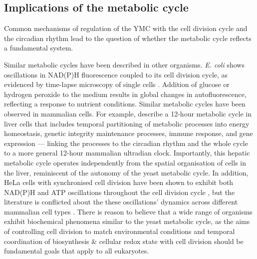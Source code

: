 \subsection{Implications of the metabolic cycle}
\label{subsec:intro-ymc-implications}


Common mechanisms of regulation of the YMC with the cell division cycle and the circadian rhythm
lead to the question of whether the metabolic cycle reflects a fundamental system.

Similar metabolic cycles have been described in other organisms.
\emph{E. coli} shows oscillations in NAD(P)H fluorescence coupled to its cell division cycle, as evidenced by time-lapse microscopy of single cells \citep{zhangDynamicSinglecellNAD2018}.
Addition of glucose or hydrogen peroxide to the medium results in global changes in autofluorescence, reflecting a response to nutrient conditions.
Similar metabolic cycles have been observed in mammalian cells.
For example, \citet{zhuLogicTemporalCompartmentalization2022} describe a 12-hour metabolic cycle in liver cells that includes temporal partitioning of metabolic processes into energy homeostasis, genetic integrity maintenance processes, immune response, and gene expression --- linking the processes to the circadian rhythm and the whole cycle to a more general 12-hour mammalian ultradian clock.
Importantly, this hepatic metabolic cycle operates independently from the spatial organisation of cells in the liver, reminiscent of the autonomy of the yeast metabolic cycle.
In addition, HeLa cells with synchronised cell division have been shown to exhibit both NAD(P)H and ATP oscillations throughout the cell division cycle \citep{ahnTemporalFluxomicsReveals2017}, but the literature is conflicted about the these oscillations' dynamics across different mammalian cell types \citep{zylstraMetabolicDynamicsCell2022}.
There is reason to believe that a wide range of organisms exhibit biochemical phenomena similar to the yeast metabolic cycle, as the aims of controlling cell division to match environmental conditions and temporal coordination of biosynthesis \& cellular redox state with cell division should be fundamental goals that apply to all eukaryotes.


